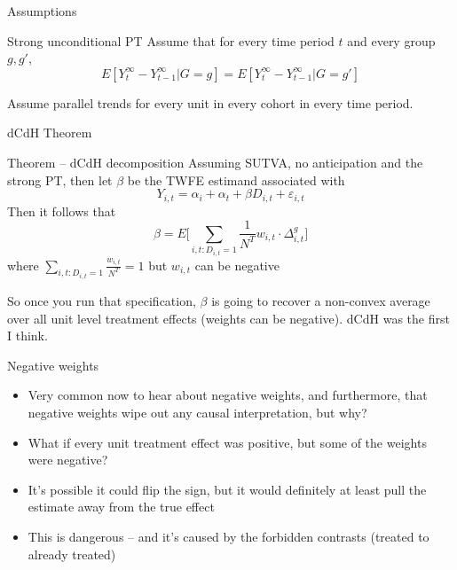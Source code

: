 \documentclass{beamer}
\begin{document}
\begin{frame}{Assumptions}

\begin{block}{Strong unconditional PT}
Assume that for every time period $t$ and every group $g,g'$, $$E[Y^\infty_t - Y^\infty_{t-1}|G=g] = E[Y^\infty_t - Y^\infty_{t-1}|G=g'] $$
\end{block}Assume parallel trends for every unit in every cohort in every time period.

\end{frame}

\begin{frame}{dCdH Theorem}

\begin{block}{Theorem -- dCdH decomposition}
Assuming SUTVA, no anticipation and the strong PT, then let $\beta$ be the TWFE estimand associated with $$Y_{i,t} = \alpha_i + \alpha_t + \beta D_{i,t} + \varepsilon_{i,t}$$Then it follows that $$\beta = E \bigg [ \sum_{i,t:D_{i,t}=1} \frac{1}{N^T} w_{i,t} \cdot \Delta_{i,t}^g \bigg ] $$ where $\sum_{i,t:D_{i,t}=1} \frac{w_{i,t}}{N^T} = 1$ but $w_{i,t}$ can be negative
\end{block}So once you run that specification, $\beta$ is going to recover a non-convex average over all unit level treatment effects (weights can be negative). dCdH was the first I think.

\end{frame}


\begin{frame}{Negative weights}

\begin{itemize}
\item Very common now to hear about negative weights, and furthermore, that negative weights wipe out any causal interpretation, but why?
\item What if every unit treatment effect was positive, but some of the weights were negative?
\item It's possible it could flip the sign, but it would definitely at least pull the estimate away from the true effect
\item This is dangerous -- and it's caused by the forbidden contrasts (treated to already treated)
\end{itemize}

\end{frame}
\end{document}
